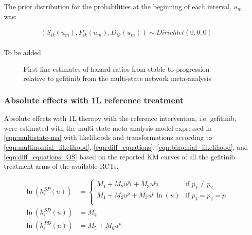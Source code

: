 \documentclass[11pt,final,fleqn]{article}\usepackage[]{graphicx}\usepackage[]{color}
\theoremstyle{plain}
\newcounter{subsubsubsection}[subsubsection]
\begin{document}
{The prior distribution for the probabilities at the beginning of each interval, $u_{m}$ was: 

\begin{equation} \label{eqn:multinomial-prior}
\begin{aligned}
(S_{ik}(u_{m}),P_{ik}(u_{m}),D_{ik}(u_{m})) \sim Dirichlet(0,0,0) \\
\end{aligned}
\end{equation}

To be added

\begin{figure}[h]
\centering
\caption{First line estimates of hazard ratios from stable to progression relative to gefitinib from the multi-state network meta-analysis}\label{fig:hr-1L}
\end{figure}


\subsubsection{Absolute effects with 1L reference treatment}
Absolute effects with 1L therapy with the reference intervention, i.e. gefitinib, were estimated with the multi-state meta-analysis model expressed in \autoref{eqn:multistate-ma} with likelihoods and transformations according to \autoref{eqn:multinomial_likelihood}, \autoref{eqn:diff_equations}, \autoref{eqn:binomial_likelihood}, and \autoref{eqn:diff_equations_OS} based on the reported KM curves of all the gefitinib treatment arms of the available RCTs.

\begin{equation}\label{eqn:multistate-ma}
\begin{aligned} 
\ln\left(h_{i}^{SP}(u)\right) &= 
\begin{cases}
M_{1} + M_{2}u^{p_1} + M_{3}u^{p_2} & \text{if } p_1 \neq p_2 \\ 
M_{1} + M_{2}u^{p} + M_{3}u^{p}\ln(u) & \text{if } p_1 = p_2 = p \\ 
\end{cases}\\ 
\ln\left(h_{i}^{SD}(u)\right) &=
M_{4}\\
\ln\left(h_{i}^{PD}(u)\right) &=
M_{5} + M_{6}u^{p_1}\\ 
\\
\end{aligned}
\end{equation}

}
\end{document}
